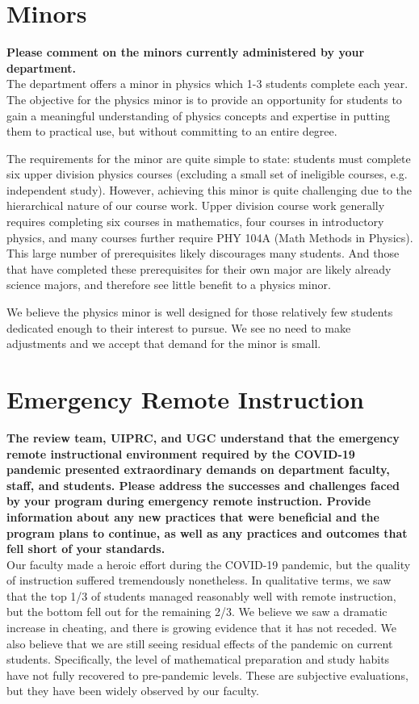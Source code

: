 \documentclass[12pt]{article}
\begin{document}
\newpage	
\section{Minors}
{\bf Please comment on the minors currently administered by your
  department.}\\[3pt]

\noindent
The department offers a minor in physics which 1-3 students complete
each year.  The objective for the physics minor is to provide an
opportunity for students to gain a meaningful understanding of physics
concepts and expertise in putting them to practical use, but without
committing to an entire degree.

The requirements for the minor are quite simple to state: students
must complete six upper division physics courses (excluding a small
set of ineligible courses, e.g. independent study).  However,
achieving this minor is quite challenging due to the hierarchical
nature of our course work.  Upper division course work generally
requires completing six courses in mathematics, four courses in
introductory physics, and many courses further require PHY 104A (Math
Methods in Physics).  This large number of prerequisites likely
discourages many students.  And those that have completed these
prerequisites for their own major are likely already science majors,
and therefore see little benefit to a physics minor.

We believe the physics minor is well designed for those relatively few
students dedicated enough to their interest to pursue.  We see no need
to make adjustments and we accept that demand for the minor is small.

\newpage
\section{Emergency Remote Instruction}
\label{sec:remote}

{\bf The review team, UIPRC, and UGC understand that the emergency
  remote instructional environment required by the COVID-19 pandemic
  presented extraordinary demands on department faculty, staff, and
  students. Please address the successes and challenges faced by your
  program during emergency remote instruction. Provide information
  about any new practices that were beneficial and the program plans
  to continue, as well as any practices and outcomes that fell short
  of your standards.}\\[3pt]

\noindent
Our faculty made a heroic effort during the COVID-19 pandemic, but the
quality of instruction suffered tremendously nonetheless.  In
qualitative terms, we saw that the top 1/3 of students managed
reasonably well with remote instruction, but the bottom fell out for
the remaining 2/3.  We believe we saw a dramatic increase in cheating,
and there is growing evidence that it has not receded.  We also
believe that we are still seeing residual effects of the pandemic on
current students.  Specifically, the level of mathematical preparation
and study habits have not fully recovered to pre-pandemic levels.
These are subjective evaluations, but they have been widely observed
by our faculty.
\end{document}
